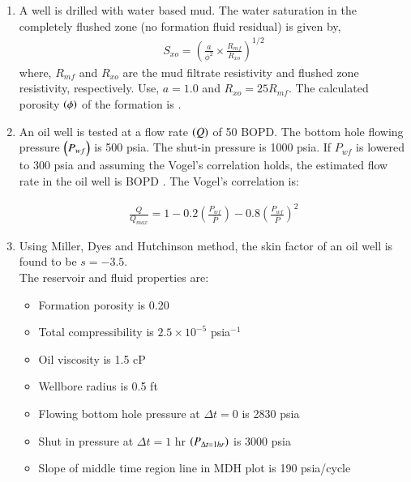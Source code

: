 \documentclass[journal,12pt,onecolumn]{IEEEtran}
\theoremstyle{remark}
\begin{document}
\begin{enumerate}
\hfill{}


\item A well is drilled with water based mud. The water saturation in the completely flushed zone (no formation fluid residual) is given by, 
\begin{align*}
S_{xo} = \left( \frac{a}{\phi^2} \times \frac{R_{mf}}{R_{xo}} \right)^{1/2}
\end{align*}
where, $R_{mf}$ and $R_{xo}$ are the mud filtrate resistivity and flushed zone resistivity, respectively. Use, $a = 1.0$ and $R_{xo} = 25 R_{mf}$. 
The calculated porosity $\left(\phi\right)$ of the formation is \underline{\hspace{2cm}}.  

\hfill{}

\item An oil well is tested at a flow rate $\left(Q\right)$ of 50 BOPD. The bottom hole flowing pressure $\left(P_{wf}\right)$ is 500 psia. The shut-in pressure is 1000 psia. If $P_{wf}$ is lowered to 300 psia and assuming the Vogel's correlation holds, the estimated flow rate in the oil well is \underline{\hspace{2cm}} BOPD . The Vogel's correlation is:

\begin{align*}
\frac{Q}{Q_{max}} = 1 - 0.2\left(\frac{P_{wf}}{\bar{P}}\right) - 0.8\left(\frac{P_{wf}}{\bar{P}}\right)^2 
\end{align*}
\hfill{}
\pagebreak

\item Using Miller, Dyes and Hutchinson  method, the skin factor of an oil well is found to be $s = -3.5$. \\ 

The reservoir and fluid properties are: 

\begin{itemize}
\item Formation porosity is 0.20
\item Total compressibility is $2.5 \times 10^{-5}$ psia$^{-1}$
\item Oil viscosity is 1.5 cP
\item Wellbore radius is 0.5 ft
\item Flowing bottom hole pressure at $\Delta t = 0$ is 2830 psia
\item Shut in pressure at $\Delta t = 1$ hr $\left(P_{\Delta t=1hr}\right)$ is 3000 psia
\item Slope of middle time region  line in MDH plot is 190 psia/cycle
\end{itemize}


\end{enumerate}
\end{document}
